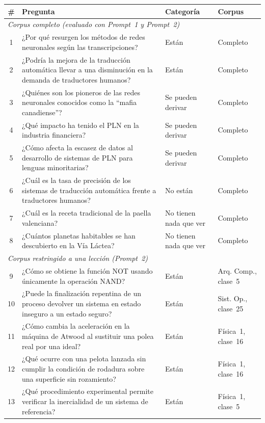 \begin{table}[H]
\centering
\footnotesize
\begin{tabular}{c p{8.0cm} p{2.2cm} p{2.2cm}}
\toprule
\textbf{\#} & \textbf{Pregunta} & \textbf{Categoría} & \textbf{Corpus} \\
\midrule
\multicolumn{4}{l}{\textit{Corpus completo (evaluado con Prompt~1 y Prompt~2)}} \\
\midrule
1 & ¿Por qué resurgen los métodos de redes neuronales según las transcripciones? & Están & Completo \\
2 & ¿Podría la mejora de la traducción automática llevar a una disminución en la demanda de traductores humanos? & Están & Completo \\
3 & ¿Quiénes son los pioneros de las redes neuronales conocidos como la ``mafia canadiense''? & Se pueden derivar & Completo \\
4 & ¿Qué impacto ha tenido el PLN en la industria financiera? & Se pueden derivar & Completo \\
5 & ¿Cómo afecta la escasez de datos al desarrollo de sistemas de PLN para lenguas minoritarias? & Se pueden derivar & Completo \\
6 & ¿Cuál es la tasa de precisión de los sistemas de traducción automática frente a traductores humanos? & No están & Completo \\
7 & ¿Cuál es la receta tradicional de la paella valenciana? & No tienen nada que ver & Completo \\
8 & ¿Cuántos planetas habitables se han descubierto en la Vía Láctea? & No tienen nada que ver & Completo \\
\midrule
\multicolumn{4}{l}{\textit{Corpus restringido a una lección (Prompt~2)}} \\
\midrule
9  & ¿Cómo se obtiene la función NOT usando únicamente la operación NAND? & Están & \multicolumn{1}{p{3cm}}{Arq. Comp., clase~5} \\
10 & ¿Puede la finalización repentina de un proceso devolver un sistema en estado inseguro a un estado seguro? & Están & \multicolumn{1}{p{3cm}}{Sist. Op., clase~25} \\
11 & ¿Cómo cambia la aceleración en la máquina de Atwood al sustituir una polea real por una ideal? & Están & Física~1, clase~16 \\
12 & ¿Qué ocurre con una pelota lanzada sin cumplir la condición de rodadura sobre una superficie sin rozamiento? & Están & Física~1, clase~16 \\
13 & ¿Qué procedimiento experimental permite verificar la inercialidad de un sistema de referencia? & Están & Física~1, clase~5 \\

\end{tabular}
\end{table}
